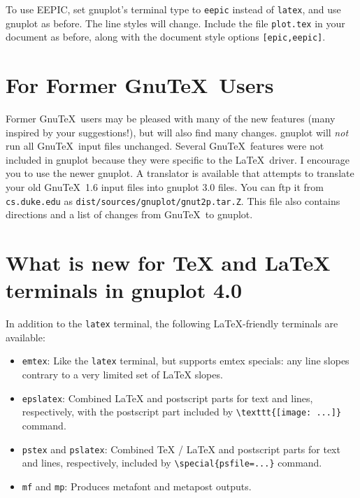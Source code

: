 To use EEPIC, set gnuplot's terminal type to {\tt eepic} instead of
{\tt latex}, and use gnuplot as before. The line styles will change.
Include the file {\tt plot.tex} in your document as before, along with
the document style options {\tt [epic,eepic]}.

\section{For Former Gnu\TeX\ Users}
\label{oldusers}

Former Gnu\TeX\ users may be pleased with many of the new features
(many inspired by your suggestions!), but will also find many changes.
gnuplot will \emph{not} run all Gnu\TeX\ input files unchanged.
Several Gnu\TeX\ features were not included in gnuplot because they
were specific to the \LaTeX\ driver. I encourage you to use the newer
gnuplot.  A translator is available that attempts to translate your
old Gnu\TeX\ 1.6 input files into gnuplot 3.0 files. You can ftp it
from \verb+cs.duke.edu+ as \verb+dist/sources/gnuplot/gnut2p.tar.Z+.
This file also contains directions and a list of changes from Gnu\TeX\
to gnuplot.

\section{What is new for \TeX{} and \LaTeX{} terminals in gnuplot 4.0}

In addition to the \texttt{latex} terminal, the following \LaTeX-friendly
terminals are available:

\begin{itemize}
\item \texttt{emtex}: Like the \texttt{latex} terminal, but supports emtex
specials: any line slopes contrary to a very limited set of \LaTeX{} slopes.

\item \texttt{epslatex}: Combined \LaTeX{} and postscript parts for text and
lines, respectively, with the postscript part included by
\verb+\texttt{[image: ...]}+ command.

\item \texttt{pstex} and \texttt{pslatex}: Combined \TeX{} / \LaTeX{} and 
postscript parts for text and lines, respectively, included by
\verb+\special{psfile=...}+ command.

\item \texttt{mf} and \texttt{mp}: Produces metafont and metapost outputs.

\end{itemize}

